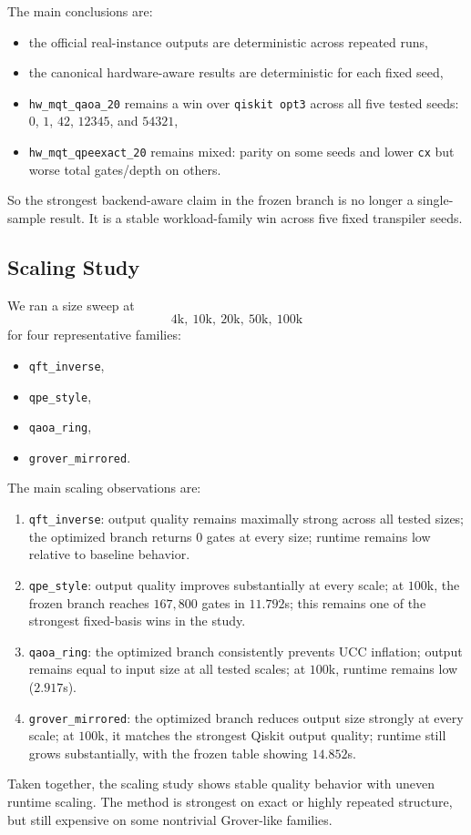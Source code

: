 \documentclass[11pt]{article}
\begin{document}
The main conclusions are:
\begin{itemize}[leftmargin=1.5em]
    \item the official real-instance outputs are deterministic across repeated runs,
    \item the canonical hardware-aware results are deterministic for each fixed seed,
    \item \texttt{hw\_mqt\_qaoa\_20} remains a win over \texttt{qiskit opt3} across all five tested seeds: $0$, $1$, $42$, $12345$, and $54321$,
    \item \texttt{hw\_mqt\_qpeexact\_20} remains mixed: parity on some seeds and lower \texttt{cx} but worse total gates/depth on others.
\end{itemize}
So the strongest backend-aware claim in the frozen branch is no longer a single-sample result. It is a stable workload-family win across five fixed transpiler seeds.

\subsection{Scaling Study}

We ran a size sweep at
\[
4\text{k},\ 10\text{k},\ 20\text{k},\ 50\text{k},\ 100\text{k}
\]
for four representative families:
\begin{itemize}[leftmargin=1.5em]
    \item \texttt{qft\_inverse},
    \item \texttt{qpe\_style},
    \item \texttt{qaoa\_ring},
    \item \texttt{grover\_mirrored}.
\end{itemize}

The main scaling observations are:
\begin{enumerate}[leftmargin=1.5em]
    \item \texttt{qft\_inverse}: output quality remains maximally strong across all tested sizes; the optimized branch returns $0$ gates at every size; runtime remains low relative to baseline behavior.
    \item \texttt{qpe\_style}: output quality improves substantially at every scale; at $100$k, the frozen branch reaches $167{,}800$ gates in $11.792$s; this remains one of the strongest fixed-basis wins in the study.
    \item \texttt{qaoa\_ring}: the optimized branch consistently prevents UCC inflation; output remains equal to input size at all tested scales; at $100$k, runtime remains low ($2.917$s).
    \item \texttt{grover\_mirrored}: the optimized branch reduces output size strongly at every scale; at $100$k, it matches the strongest Qiskit output quality; runtime still grows substantially, with the frozen table showing $14.852$s.
\end{enumerate}
Taken together, the scaling study shows stable quality behavior with uneven runtime scaling. The method is strongest on exact or highly repeated structure, but still expensive on some nontrivial Grover-like families.
\end{document}
